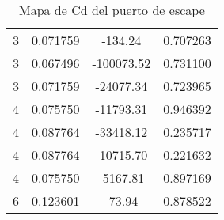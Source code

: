 \begin{table}
\begin{tabular}{cccc}
      3     & 0.071759  & -134.24       &  0.707263 \\
      3     & 0.067496  & -100073.52    &  0.731100 \\
      3     & 0.071759  & -24077.34     &  0.723965 \\
      4     & 0.075750  & -11793.31     &  0.946392 \\
      4     & 0.087764  & -33418.12     &  0.235717 \\
      4     & 0.087764  & -10715.70     &  0.221632 \\
      4     & 0.075750  & -5167.81      &  0.897169 \\
      6     & 0.123601  & -73.94        &  0.878522 \\ \bottomrule
    \end{tabular}
  \caption{Mapa de Cd del puerto de escape} \label{tab:mapa_cd_escape}
\end{table}

